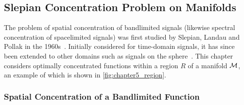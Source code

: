 \subsection{Slepian Concentration Problem on Manifolds}\label{sec:chapter5_slepian_concentration_problem_manifolds}

The problem of spatial concentration of bandlimited signals (likewise spectral concentration of spacelimited signals) was first studied by Slepian, Landau and Pollak in the 1960s~\cite{Slepian1961,Landau1961,Landau1962}.
Initially considered for time-domain signals, it has since been extended to other domains such as signals on the sphere~\cite{Simons2006,Roddy2022,Xu1983,Wieczorek2005}.
This chapter considers optimally concentrated functions within a region \(R\) of a manifold \(\mathcal{M}{}\), an example of which is shown in \cref{fig:chapter5_region}.



\subsubsection{Spatial Concentration of a Bandlimited Function}

